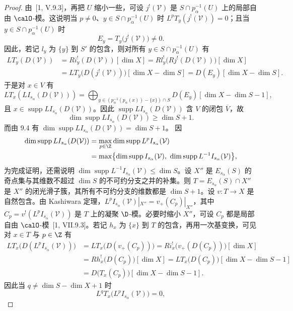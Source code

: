 \begin{proof}
由~[1, V.9.3]，再把 $U$ 缩小一些，可设 $j^!(\mathcal{V})$ 是 $S\cap p_\alpha^{-1}(U)$ 上的局部自由 $\calO$-模。这说明当 $p\ne 0$、$y\in S\cap p_\alpha^{-1}(U)$ 时 $L^pT_y(j^!(\mathcal{V}))=0$；且当 $y\in S\cap p_\alpha^{-1}(U)$ 时
$$E_y=T_y\bigl(j^!(\mathcal{V})\bigr)\ne 0.$$
因此，若记 $l_y$ 为 $\{y\}$ 到 $S'$ 的包含，则对所有 $y\in S\cap p_\alpha^{-1}(U)$ 有
{\small
\begin{align*}
LT_y(D(\mathcal{V}))&=Ri_y^!(D(\mathcal{V}))[\dim X]=Rl_y^!\bigl(Rj^!(D(\mathcal{V}))\bigr)[\dim X]\\
&=LT_y\bigl(D(j^!(\mathcal{V}))\bigr)[\dim X-\dim S]=D(E_y)[\dim X-\dim S].
\end{align*}}
于是对 $x\in V$ 有
{\small
$$LT_x(LI_{s_\alpha}(D(\mathcal{V})))=\bigoplus_{y\in(p_\alpha^{-1}(p_\alpha(x))-\{x\})\cap S}D(E_y)[\dim X-\dim S-1],$$}
且 $x\in\operatorname{supp}LI_{s_\alpha}(D(\mathcal{V}))$。因此 $\operatorname{supp}LI_{s_\alpha}(D(\mathcal{V}))$ 含 $V$ 的闭包 $\overline V$，故
$$\dim\operatorname{supp}LI_{s_\alpha}(D(\mathcal{V}))\ge\dim S+1.$$
而由 9.4 有 $\dim\operatorname{supp}LI_{s_\alpha}(D(\mathcal{V}))=\dim S+1$。
因
\begin{align*}
\dim\operatorname{supp}LI_{s_\alpha}(D(\mathcal{V}))&=\max_{p\in\Z}\dim\operatorname{supp}L^pI_{s_\alpha}(\mathcal{V})\\
&=\max\bigl\{\dim\operatorname{supp}I_{s_\alpha}(\mathcal{V}),\ \dim\operatorname{supp}L^{-1}I_{s_\alpha}(\mathcal{V})\bigr\},
\end{align*}
为完成证明，还需说明 $\dim\operatorname{supp}L^{-1}I_{s_\alpha}(\mathcal{V})\le\dim S$。设 $X''$ 是 $E_{s_\alpha}(S)$ 的奇点集与其维数不超过 $\dim S$ 的不可约分支之并的补集。则 $T=E_{s_\alpha}(S)\cap X''$ 是 $X''$ 的闭光滑子簇，其所有不可约分支的维数都是 $\dim S+1$。设 $v:T\to X$ 是自然包含。由 Kashiwara 定理，$L^pI_{s_\alpha}(\mathcal{V})|_{X''}=v_+(C_p)|_{X''}$，其中 $C_p=v^!(L^pI_{s_\alpha}(\mathcal{V}))$ 是 $T$ 上的凝聚 $\D$-模。必要时缩小 $X''$，可设 $C_p$ 都是局部自由 $\calO$-模~[1, VII.9.3]。若记 $h_x$ 为 $\{x\}$ 到 $T$ 的包含，再用一次基变换，可见对 $x\in T$ 与 $p\in\Z$ 有
{\small
\begin{align*}
LT_x\bigl(D(L^pI_{s_\alpha}(\mathcal{V}))\bigr)&=LT_x\bigl(D(v_+(C_p))\bigr)=Ri_x^!\bigl(v_+(D(C_p))\bigr)[\dim X]\\
&=Rh_x^!\bigl(D(C_p)\bigr)[\dim X]=LT_x\bigl(D(C_p)\bigr)[\dim X-\dim S-1]\\
&=D\bigl(T_x(C_p)\bigr)[\dim X-\dim S-1].
\end{align*}}
因此当 $q\ne\dim S-\dim X+1$ 时
$$L^qT_x\bigl(L^pI_{s_\alpha}(\mathcal{V})\bigr)=0,$$

\end{proof}

